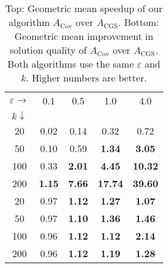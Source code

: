         \begin{table}[h!]
        \centering
        \caption{Top: Geometric mean speedup of our algorithm $A_{\text{Cov}}$ over $A_{\text{CGS}}$. Bottom: Geometric mean improvement in solution quality of $A_{\text{Cov}}$ over $A_{\text{CGS}}$. Both algorithms use the same $\varepsilon$ and $k$. Higher numbers are better.}        
        \begin{tabular}{c|cccc}
        $\varepsilon \rightarrow$   & 0.1 & 0.5 & 1.0 & 4.0 \\
        $k \downarrow$             & & & & \\
        \hline
        20              & 0.02 & 0.14 & 0.32 & 0.72 \\
        50              & 0.10 & 0.59 & \textbf{1.34} & \textbf{3.05} \\
        100             & 0.33 & \textbf{2.01} & \textbf{4.45} & \textbf{10.32} \\
        200             & \textbf{1.15} & \textbf{7.66} & \textbf{17.74} & \textbf{39.60} \\
        \hline
        20              & 0.97 & \textbf{1.12} & \textbf{1.27} & \textbf{1.07} \\
        50              & 0.97 & \textbf{1.10} & \textbf{1.36} & \textbf{1.46} \\
        100             & 0.96 & \textbf{1.12} & \textbf{1.12} & \textbf{2.14} \\
        200             & 0.96 & \textbf{1.12} & \textbf{1.19} & \textbf{1.28} \\
        \hline
        \end{tabular}  
        \label{tab:table1}
        \end{table}

